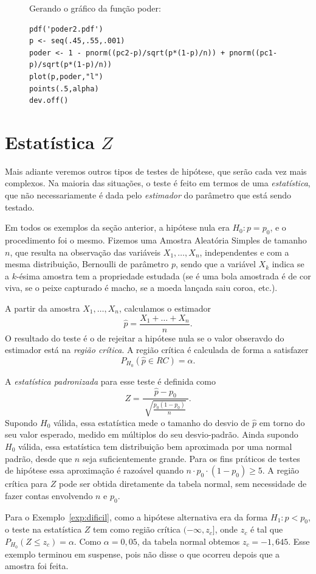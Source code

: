\documentclass[12pt,a4paper]{article}
\theoremstyle{plain}
\theoremstyle{definition}
\theoremstyle{remark}
\begin{document}
\begin{figure}[H]
Gerando o gráfico da função poder:
\footnotesize
\begin{verbatim}
pdf('poder2.pdf')
p <- seq(.45,.55,.001)
poder <- 1 - pnorm((pc2-p)/sqrt(p*(1-p)/n)) + pnorm((pc1-p)/sqrt(p*(1-p)/n))
plot(p,poder,"l")
points(.5,alpha)
dev.off()
\end{verbatim}
\end{figure}

\section{Estatística $Z$}

Mais adiante veremos outros tipos de testes de hipótese, que serão cada vez mais complexos.
Na maioria das situações, o teste é feito em termos de uma \emph{estatística}, que não necessariamente é dada pelo \emph{estimador} do parâmetro que está sendo testado.

Em todos os exemplos da seção anterior, a hipótese nula era $H_0:p=p_0$, e o procedimento foi o mesmo.
Fizemos uma Amostra Aleatória Simples de tamanho $n$, que resulta na observação das variáveis $X_1,\dots,X_n$, independentes e com a mesma distribuição, Bernoulli de parâmetro $p$, sendo que a variável $X_k$ indica se a $k$-ésima amostra tem a propriedade estudada (se é uma bola amostrada é de cor viva, se o peixe capturado é macho, se a moeda lançada saiu coroa, etc.).

A partir da amostra $X_1,\dots,X_n$, calculamos o estimador
\[
\hat{p} = \frac{X_1 + \dots + X_n}{n}
.
\]
O resultado do teste é o de rejeitar a hipótese nula se o valor obseravdo do estimador está na \emph{região crítica}.
A região crítica é calculada de forma a satisfazer
\[
P_{H_0}(\hat{p} \in RC) = \alpha.
\]

A \emph{estatística padronizada} para esse teste é definida como
\[
Z = \frac{\hat{p}-p_0}{\ \sqrt{\frac{p_0(1-p_0)}{n}}\ }
.
\]
Supondo $H_0$ válida, essa estatística mede o tamanho do desvio de $\hat{p}$ em torno do seu valor esperado, medido em múltiplos do seu desvio-padrão.
Ainda supondo $H_0$ válida, essa estatística tem distribuição bem aproximada por uma normal padrão, desde que $n$ seja suficientemente grande.
Para os fins práticos de testes de hipótese essa aproximação é razoável quando $n \cdot p_0 \cdot (1-p_0) \geq 5$.
A região crítica para $Z$ pode ser obtida diretamente da tabela normal, sem necessidade de fazer contas envolvendo $n$ e $p_0$.

Para o Exemplo~\ref{exp:dificil}, como a hipótese alternativa era da forma $H_1:p<p_0$, o teste na estatística $Z$ tem como região crítica $(-\infty, z_c]$, onde $z_c$ é tal que $P_{H_0}(Z \leq z_c) = \alpha$.
Como $\alpha=0,05$, da tabela normal obtemos $z_c = -1,645$.
Esse exemplo terminou em suspense, pois não disse o que ocorreu depois que a amostra foi feita.
\end{document}

